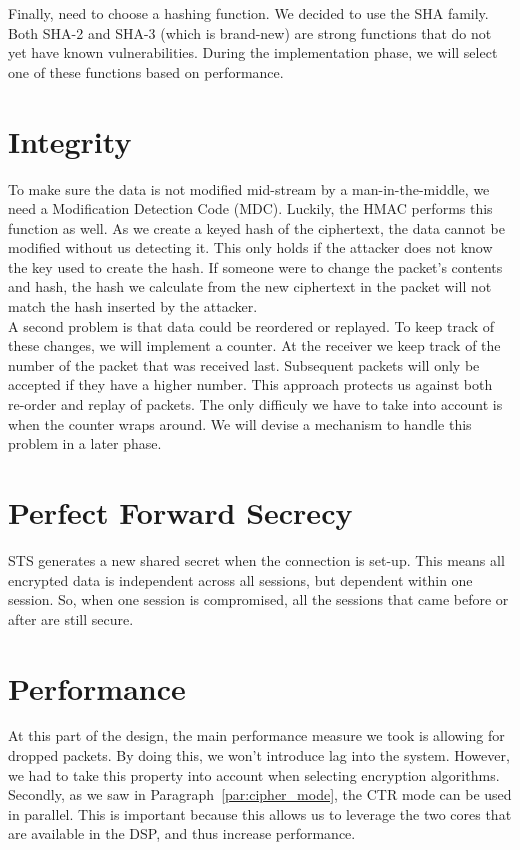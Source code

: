 \documentclass[a4paper]{article}
\begin{document}
Finally, need to choose a hashing function. We decided to use the SHA family. Both SHA-2 and SHA-3 (which is brand-new) are strong functions that do not yet have known vulnerabilities. During the implementation phase, we will select one of these functions based on performance.

\section{Integrity}

To make sure the data is not modified mid-stream by a man-in-the-middle, we need a Modification Detection Code (MDC). Luckily, the HMAC performs this function as well. As we create a keyed hash of the ciphertext, the data cannot be modified without us detecting it. This only holds if the attacker does not know the key used to create the hash. If someone were to change the packet's contents and hash, the hash we calculate from the new ciphertext in the packet will not match the hash inserted by the attacker.\\

A second problem is that data could be reordered or replayed. To keep track of these changes, we will implement a counter. At the receiver we keep track of the number of the packet that was received last. Subsequent packets will only be accepted if they have a higher number. This approach protects us against both re-order and replay of packets. The only difficuly we have to take into account is when the counter wraps around. We will devise a mechanism to handle this problem in a later phase.

\section{Perfect Forward Secrecy}

STS generates a new shared secret when the connection is set-up. This means all encrypted data is independent across all sessions, but dependent within one session. So, when one session is compromised, all the sessions that came before or after are still secure.

\section{Performance}

At this part of the design, the main performance measure we took is allowing for dropped packets. By doing this, we won't introduce lag into the system. However, we had to take this property into account when selecting encryption algorithms.\\

Secondly, as we saw in Paragraph~\ref{par:cipher_mode}, the CTR mode can be used in parallel. This is important because this allows us to leverage the two cores that are available in the DSP, and thus increase performance.
\end{document}
